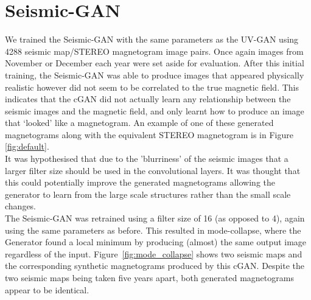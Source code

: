 \documentclass[11pt,a4paper,onecolumn]{report}
\begin{document}
\section{Seismic-GAN}
\label{sec:train_seismic}

We trained the Seismic-GAN with the same parameters as the UV-GAN using 4288
seismic map/STEREO magnetogram image pairs. Once again images from November or
December each year were set aside for evaluation. After this initial training,
the Seismic-GAN was able to produce images that appeared physically realistic
however did not seem to be correlated to the true magnetic field. This indicates
that the cGAN did not actually learn any relationship between the seismic images
and the magnetic field, and only learnt how to produce an image that `looked'
like a magnetogram. An example of one of these generated magnetograms along with
the equivalent STEREO magnetogram is in Figure \ref{fig:default}. \\



It was hypothesised that due to the 'blurriness' of the seismic images that a
larger filter size should be used in the convolutional layers. It was thought
that this could potentially improve the generated magnetograms allowing the
generator to learn from the large scale structures rather than the small scale
changes.\\

The Seismic-GAN was retrained using a filter size of 16 (as opposed to 4), again
using the same parameters as before. This resulted in mode-collapse, where
the Generator found a local minimum by producing (almost) the same output
image regardless of the input. Figure~\ref{fig:mode_collapse} shows two seismic
maps and the corresponding synthetic magnetograms produced by this cGAN. Despite
the two seismic maps being taken five years apart, both generated magnetograms
appear to be identical.\\
\end{document}
